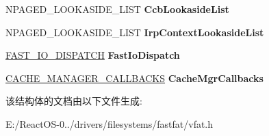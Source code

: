\begin{DoxyCompactItemize}
N\+P\+A\+G\+E\+D\+\_\+\+L\+O\+O\+K\+A\+S\+I\+D\+E\+\_\+\+L\+I\+ST {\bfseries Ccb\+Lookaside\+List}
\item 
\mbox{\label{struct_v_f_a_t___g_l_o_b_a_l___d_a_t_a_a099a71dad1bc83e9a4ede11df6db1bf3}} 
N\+P\+A\+G\+E\+D\+\_\+\+L\+O\+O\+K\+A\+S\+I\+D\+E\+\_\+\+L\+I\+ST {\bfseries Irp\+Context\+Lookaside\+List}
\item 
\mbox{\label{struct_v_f_a_t___g_l_o_b_a_l___d_a_t_a_a6d88fcdf7b74a4c142b7759a231de016}} 
\hyperlink{struct___f_a_s_t___i_o___d_i_s_p_a_t_c_h}{F\+A\+S\+T\+\_\+\+I\+O\+\_\+\+D\+I\+S\+P\+A\+T\+CH} {\bfseries Fast\+Io\+Dispatch}
\item 
\mbox{\label{struct_v_f_a_t___g_l_o_b_a_l___d_a_t_a_a985e1915f184618a9b38ea695a536d02}} 
\hyperlink{struct___c_a_c_h_e___m_a_n_a_g_e_r___c_a_l_l_b_a_c_k_s}{C\+A\+C\+H\+E\+\_\+\+M\+A\+N\+A\+G\+E\+R\+\_\+\+C\+A\+L\+L\+B\+A\+C\+KS} {\bfseries Cache\+Mgr\+Callbacks}
\end{DoxyCompactItemize}


该结构体的文档由以下文件生成\+:\begin{DoxyCompactItemize}
\item 
E\+:/\+React\+O\+S-\/0../drivers/filesystems/fastfat/vfat.\+h\end{DoxyCompactItemize}
